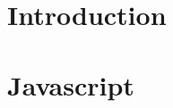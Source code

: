 \documentclass[11pt,english,fleqn,openany,letterpaper,pagesize]{scrbook}
\begin{document}
 
 \newpage
\tableofcontents %
\listoffigures %

\newpage

\chapter{Introduction}
    \label{Introduction}


\chapter{Javascript}
    \label{Javascript}

\end{document}
